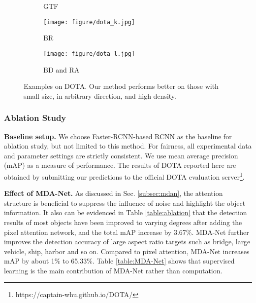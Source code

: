 \documentclass[10pt,twocolumn,letterpaper]{article}
\begin{document}
\begin{figure*}[t]
\begin{subfigure}{.15\textwidth}
			\caption{GTF}
			\label{fig:dota_j}
		\end{subfigure}
		\begin{subfigure}{.15\textwidth}
			\centering
			\texttt{[image: figure/dota\_k.jpg]}
			\caption{BR}
			\label{fig:dota_k}
		\end{subfigure}\begin{subfigure}{.15\textwidth}
			\centering
			\texttt{[image: figure/dota\_l.jpg]}
			\caption{BD and RA}
			\label{fig:dota_l}
		\end{subfigure}
		\vspace{-10pt}
		\caption{Examples on DOTA. Our method performs better on those with small size, in arbitrary direction, and high density.}	\label{fig:dota}
	\end{figure*}
	




	
	
	\subsubsection{Ablation Study}
	{\bf \quad Baseline setup.} We choose Faster-RCNN-based RCNN \cite{jiang2017r2cnn} as the baseline for ablation study, but not limited to this method. For fairness, all experimental data and parameter settings are strictly consistent. We use mean average precision (mAP) as a measure of performance. The results of DOTA reported here are obtained by submitting our predictions to the official DOTA evaluation server\footnote{https://captain-whu.github.io/DOTA/}.
	
	{\bf Effect of MDA-Net.} As discussed in Sec. \ref{subsec:mdan}, the attention structure is beneficial to suppress the influence of noise and highlight the object information. It also can be evidenced in Table \ref{table:ablation} that the detection results of most objects have been improved to varying degrees after adding the pixel attention network, and the total mAP increase by 3.67\%. MDA-Net further improves the detection accuracy of large aspect ratio targets such as bridge, large vehicle, ship, harbor and so on. Compared to pixel attention, MDA-Net increases mAP by about 1\% to 65.33\%. Table \ref{table:MDA-Net} shows that supervised learning is the main contribution of MDA-Net rather than computation.
	
\end{document}
